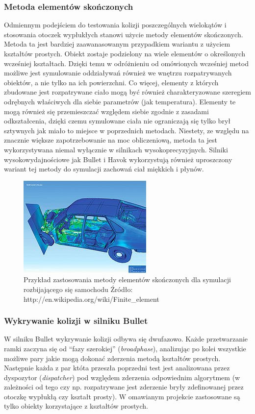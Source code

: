 \subsubsection{Metoda elementów skończonych}
Odmiennym podejściem do testowania kolizji poszczególnych wielokątów i
stosowania otoczek wypłukłych stanowi użycie metody elementów skończonych.
Metoda ta jest bardziej zaawanasowanym przypadkiem wariantu z użyciem kształtów
prostych. Obiekt zostaje podzielony na wiele elementów o określonych wcześniej
kształtach. Dzięki temu w odróżnieniu od omówionych wcześniej metod możliwe jest
symulowanie oddziaływań również we wnętrzu rozpatrywanych obiektów, a nie tylko
na ich powierzchni. Co więcej, elementy z których zbudowane jest rozpatrywane
ciało mogą być również charakteryzowane szeregiem odrębnych właściwych dla
siebie parametrów (jak temperatura). Elementy te mogą również się przemieszczać
względem siebie zgodnie z zasadami odkształcenia, dzięki czemu symulowane ciała
nie ograniczają się tylko brył sztywnych jak miało to miejsce w poprzednich
metodach. Niestety, ze względu na znacznie większe zapotrzebowanie na moc
obliczeniową, metoda ta jest wykorzystywana niemal wyłącznie w silnikach
wysokoprecyzyjnych. Silniki wysokowydajnościowe jak Bullet i Havok wykorzystują
również uproszczony wariant tej metody do symulacji zachowań ciał miękkich i płynów.

\begin{figure}
\centering
\includegraphics[scale=1]{./img/finiteElementApplication.jpg}
\caption{Przykład zastosowania metody elementów skończonych dla symulacji
rozbijającego się samochodu Źródło:
http://en.wikipedia.org/wiki/Finite\_element}
\label{fig:finiteElementApplication}
\end{figure}

\subsubsection{Wykrywanie kolizji w silniku Bullet}
W silniku Bullet wykrywanie kolizji odbywa się dwufazowo. Każde przetwarzanie
ramki zaczyna się od ``fazy szerokiej'' (\emph{broadphase}), analizując po kolei
wszystkie możliwe pary jakie mogą dokonać zderzenia metodą kształtów prostych.
Następnie każda z par któta przeszła poprzedni test jest analizowana przez
dyspozytor (\emph{dispatcher}) pod względem zderzenia odpowiednim algorytmem (w
zależności od tego czy np. rozpatrywane jest zderzenie bryły zdefinowanej przez
otoczkę wypłukłą czy kształt prosty). W omawianym projekcie zastosowane są
tylko obiekty korzystające z kształtów prostych.

